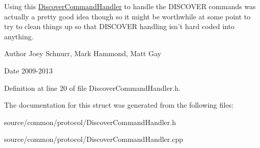 Using this \hyperlink{struct_picto_1_1_discover_command_handler}{Discover\-Command\-Handler} to handle the D\-I\-S\-C\-O\-V\-E\-R commands was actually a pretty good idea though so it might be worthwhile at some point to try to clean things up so that D\-I\-S\-C\-O\-V\-E\-R handling isn't hard coded into anything. \begin{DoxyAuthor}{Author}
Joey Schnurr, Mark Hammond, Matt Gay 
\end{DoxyAuthor}
\begin{DoxyDate}{Date}
2009-\/2013 
\end{DoxyDate}


Definition at line 20 of file Discover\-Command\-Handler.\-h.



The documentation for this struct was generated from the following files\-:\begin{DoxyCompactItemize}
\item 
source/common/protocol/Discover\-Command\-Handler.\-h\item 
source/common/protocol/Discover\-Command\-Handler.\-cpp\end{DoxyCompactItemize}
